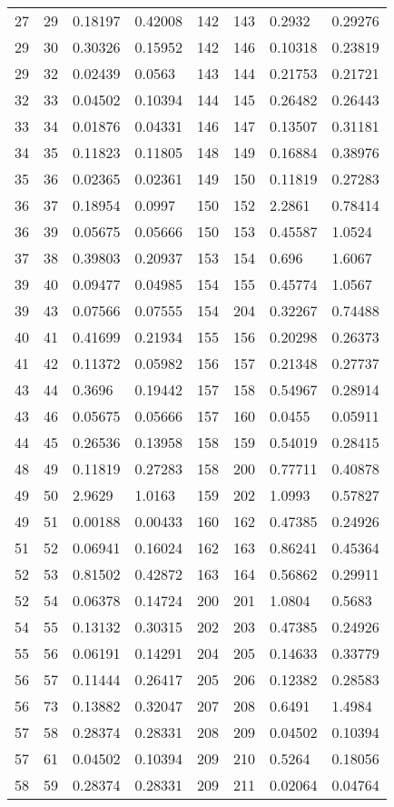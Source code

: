 \begin{tabular}{llllllll}
27&29&0.18197&0.42008&142&143&0.2932&0.29276\\
29&30&0.30326&0.15952&142&146&0.10318&0.23819\\
29&32&0.02439&0.0563&143&144&0.21753&0.21721\\
32&33&0.04502&0.10394&144&145&0.26482&0.26443\\
33&34&0.01876&0.04331&146&147&0.13507&0.31181\\
34&35&0.11823&0.11805&148&149&0.16884&0.38976\\
35&36&0.02365&0.02361&149&150&0.11819&0.27283\\
36&37&0.18954&0.0997&150&152&2.2861&0.78414\\
36&39&0.05675&0.05666&150&153&0.45587&1.0524\\
37&38&0.39803&0.20937&153&154&0.696&1.6067\\
39&40&0.09477&0.04985&154&155&0.45774&1.0567\\
39&43&0.07566&0.07555&154&204&0.32267&0.74488\\
40&41&0.41699&0.21934&155&156&0.20298&0.26373\\
41&42&0.11372&0.05982&156&157&0.21348&0.27737\\
43&44&0.3696&0.19442&157&158&0.54967&0.28914\\
43&46&0.05675&0.05666&157&160&0.0455&0.05911\\
44&45&0.26536&0.13958&158&159&0.54019&0.28415\\
48&49&0.11819&0.27283&158&200&0.77711&0.40878\\
49&50&2.9629&1.0163&159&202&1.0993&0.57827\\
49&51&0.00188&0.00433&160&162&0.47385&0.24926\\
51&52&0.06941&0.16024&162&163&0.86241&0.45364\\
52&53&0.81502&0.42872&163&164&0.56862&0.29911\\
52&54&0.06378&0.14724&200&201&1.0804&0.5683\\
54&55&0.13132&0.30315&202&203&0.47385&0.24926\\
55&56&0.06191&0.14291&204&205&0.14633&0.33779\\
56&57&0.11444&0.26417&205&206&0.12382&0.28583\\
56&73&0.13882&0.32047&207&208&0.6491&1.4984\\
57&58&0.28374&0.28331&208&209&0.04502&0.10394\\
57&61&0.04502&0.10394&209&210&0.5264&0.18056\\
58&59&0.28374&0.28331&209&211&0.02064&0.04764\\

\end{tabular}
